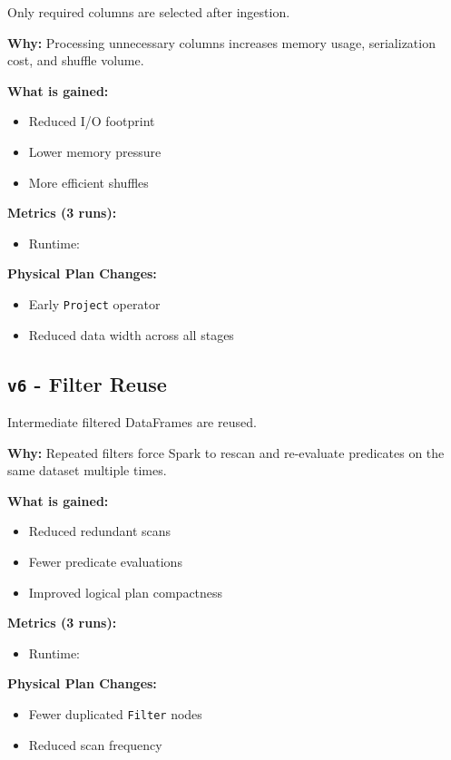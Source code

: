 \documentclass[conference,a4paper]{IEEEtran}
\begin{document}
Only required columns are selected after ingestion.

\textbf{Why:}
Processing unnecessary columns increases memory usage, serialization cost,
and shuffle volume.

\textbf{What is gained:}
\begin{itemize}
    \item Reduced I/O footprint
    \item Lower memory pressure
    \item More efficient shuffles
\end{itemize}

\textbf{Metrics (3 runs):}
\begin{itemize}
    \item Runtime: \texttt{}
\end{itemize}

\textbf{Physical Plan Changes:}
\begin{itemize}
    \item Early \texttt{Project} operator
    \item Reduced data width across all stages
\end{itemize}

\subsection{\texttt{v6} - Filter Reuse}
\label{sec:v6}

Intermediate filtered DataFrames are reused.

\textbf{Why:}
Repeated filters force Spark to rescan and re-evaluate predicates on the same
dataset multiple times.

\textbf{What is gained:}
\begin{itemize}
    \item Reduced redundant scans
    \item Fewer predicate evaluations
    \item Improved logical plan compactness
\end{itemize}

\textbf{Metrics (3 runs):}
\begin{itemize}
    \item Runtime: \texttt{}
\end{itemize}

\textbf{Physical Plan Changes:}
\begin{itemize}
    \item Fewer duplicated \texttt{Filter} nodes
    \item Reduced scan frequency
\end{itemize}
\end{document}
